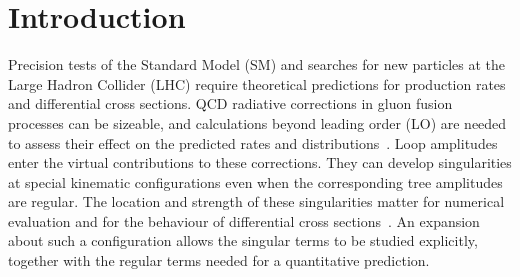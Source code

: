 \section{Introduction}
\label{sec:introduction}

Precision tests of the Standard Model (SM) and searches for new particles
at the Large Hadron Collider (LHC) require theoretical predictions for
production rates and differential cross sections.
QCD radiative corrections in gluon fusion processes can be sizeable, and
calculations beyond leading order (LO) are needed to assess their effect
on the predicted rates and distributions~\cite{Baglio:2023euv}.
Loop amplitudes enter the virtual contributions to these corrections.
They can develop singularities at special kinematic configurations even
when the corresponding tree amplitudes are regular.
The location and strength of these singularities matter for numerical
evaluation and for the behaviour of differential cross sections~\cite{BDFS2012,GauntStirling2011,DixonEsterlis2016,DixonEsterlis2016Erratum}.
An expansion about such a configuration allows the singular terms to be studied explicitly, together with the regular terms needed for a quantitative prediction.

